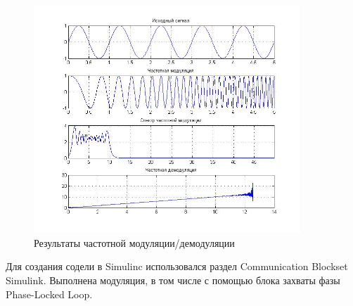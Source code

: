 \documentclass[10pt,a4paper]{article}
\begin{document}
\begin{figure}[h]\centering
	\includegraphics[width=10cm]{fm}
	\caption{Результаты частотной модуляции/демодуляции}\label{fig.fm}
\end{figure}                                                                                                                                                                                                                                                                                                                                                                                                                                                                                                                                                                                                                                                                                                                                                                                                                                                                                                                                                                                                                                                                                                                                                                                                                                                                                                                                                                                                                                                                        
\FloatBarrier

Для создания содели в Simulinc использовался раздел Communication Blockset Simulink. Выполнена модуляция, в том числе с помощью блока захваты фазы Phase-Locked Loop.
\end{document}

